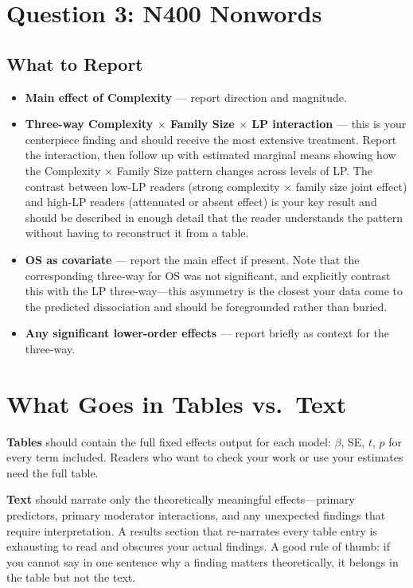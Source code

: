 \documentclass[12pt]{article}
\begin{document}
	\section*{Question 3: N400 Nonwords}
	
	\subsection*{What to Report}
	
	\begin{itemize}
		\item \textbf{Main effect of Complexity} --- report direction and magnitude.
		\item \textbf{Three-way Complexity $\times$ Family Size $\times$ LP interaction} --- this is your centerpiece finding and should receive the most extensive treatment. Report the interaction, then follow up with estimated marginal means showing how the Complexity $\times$ Family Size pattern changes across levels of LP. The contrast between low-LP readers (strong complexity $\times$ family size joint effect) and high-LP readers (attenuated or absent effect) is your key result and should be described in enough detail that the reader understands the pattern without having to reconstruct it from a table.
		\item \textbf{OS as covariate} --- report the main effect if present. Note that the corresponding three-way for OS was not significant, and explicitly contrast this with the LP three-way---this asymmetry is the closest your data come to the predicted dissociation and should be foregrounded rather than buried.
		\item \textbf{Any significant lower-order effects} --- report briefly as context for the three-way.
	\end{itemize}
	
	\section*{What Goes in Tables vs.\ Text}
	
	\textbf{Tables} should contain the full fixed effects output for each model: $\beta$, SE, $t$, $p$ for every term included. Readers who want to check your work or use your estimates need the full table.
	
	\textbf{Text} should narrate only the theoretically meaningful effects---primary predictors, primary moderator interactions, and any unexpected findings that require interpretation. A results section that re-narrates every table entry is exhausting to read and obscures your actual findings. A good rule of thumb: if you cannot say in one sentence why a finding matters theoretically, it belongs in the table but not the text.
	
\end{document}

